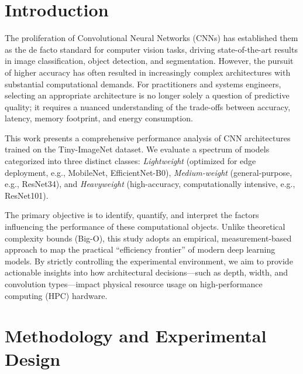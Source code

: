\documentclass[acmsmall]{acmart}
\begin{document}


\maketitle


\section{Introduction}

The proliferation of Convolutional Neural Networks (CNNs) has established them as the de facto standard for computer vision tasks, driving state-of-the-art results in image classification, object detection, and segmentation. However, the pursuit of higher accuracy has often resulted in increasingly complex architectures with substantial computational demands. For practitioners and systems engineers, selecting an appropriate architecture is no longer solely a question of predictive quality; it requires a nuanced understanding of the trade-offs between accuracy, latency, memory footprint, and energy consumption.

This work presents a comprehensive performance analysis of CNN architectures trained on the Tiny-ImageNet dataset. We evaluate a spectrum of models categorized into three distinct classes: \textit{Lightweight} (optimized for edge deployment, e.g., MobileNet, EfficientNet-B0), \textit{Medium-weight} (general-purpose, e.g., ResNet34), and \textit{Heavyweight} (high-accuracy, computationally intensive, e.g., ResNet101).

The primary objective is to identify, quantify, and interpret the factors influencing the performance of these computational objects. Unlike theoretical complexity bounds (Big-O), this study adopts an empirical, measurement-based approach to map the practical ``efficiency frontier'' of modern deep learning models. By strictly controlling the experimental environment, we aim to provide actionable insights into how architectural decisions—such as depth, width, and convolution types—impact physical resource usage on high-performance computing (HPC) hardware.

\section{Methodology and Experimental Design}
\end{document}

